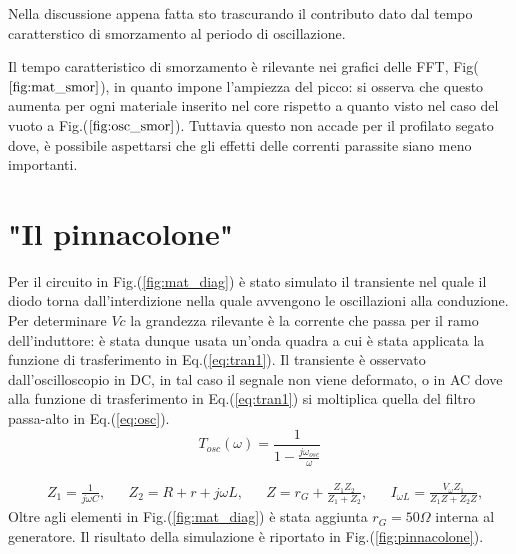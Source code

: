 \documentclass{article}
\begin{document}
        Nella discussione appena fatta sto trascurando il contributo dato dal 
        tempo caratterstico di smorzamento al periodo di oscillazione.
        
        Il tempo caratteristico di smorzamento è rilevante nei grafici 
        delle FFT, Fig($\ref{fig:mat_smor}$), in quanto impone l'ampiezza del picco:
        si osserva che questo aumenta per ogni materiale inserito nel core 
        rispetto a quanto visto nel caso  del vuoto a Fig.($\ref{fig:osc_smor}$).
        Tuttavia questo non accade per il profilato segato dove, è possibile  
        aspettarsi che gli effetti delle correnti parassite siano meno importanti.

        





\section{"Il pinnacolone"}
    Per il circuito in Fig.(\ref{fig:mat_diag}) è stato simulato il transiente nel quale 
    il diodo torna dall'interdizione nella quale avvengono le oscillazioni alla conduzione.
    Per determinare $Vc$ la grandezza rilevante è la corrente che passa per il 
    ramo dell'induttore: è stata dunque usata un'onda quadra a cui è stata applicata la 
    funzione di trasferimento in Eq.(\ref{eq:tran1}).
    Il transiente è osservato dall'oscilloscopio in DC, in tal caso il segnale non viene 
    deformato, o in AC dove alla funzione di trasferimento in Eq.(\ref{eq:tran1}) si 
    moltiplica quella del filtro passa-alto in Eq.(\ref{eq:osc}).
        \begin{equation}
            T_{osc}(\omega)=\frac{1}{1-\frac{j\omega_{osc}}{\omega}}        
            \label{eq:osc}
        \end{equation}
    
        \begin{align*}
            &Z_1=\frac{1}{j \omega C}, & &Z_2= R + r + j \omega L, & &Z=r_{G}+\frac{Z_1 Z_2}{Z_1 +Z_2}, & &I_{\omega L}=\frac{V_{\omega} Z_1}{Z_1 Z + Z_2 Z}, 
            \label{eq:tran1}
        \end{align*}
    Oltre agli elementi in Fig.(\ref{fig:mat_diag}) è stata aggiunta $r_{G} = 50 \Omega$ interna al generatore.
    Il risultato della simulazione è riportato in Fig.(\ref{fig:pinnacolone}).
\end{document}
